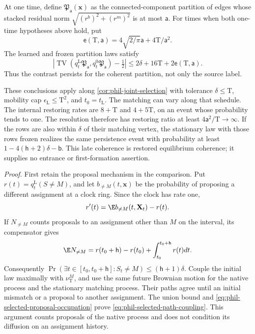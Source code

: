 At one time, define \(\mathfrak P_{\mathsf a}(\mathbf x)\) as the
connected-component partition of edges whose stacked residual norm
\(\sqrt{(r^b)^2+(r^m)^2}\) is at most \(\mathsf a\).
For times when both
one-time hypotheses above hold, put
\[
 \mathsf e(\mathrm T,\mathsf a)
 =4\sqrt{2/\pi}\mathsf a+4\mathrm T/\mathsf a^2.
\]
The learned and frozen partition laws satisfy
\begin{equation}
 \left|\operatorname{TV}
   (q_t^{\mathrm L}\mathfrak P_{\mathsf a},
                 q_t^0\mathfrak P_{\mathsf a})-\tfrac12\right|
 \le2\delta+16\mathrm T+2\mathsf e(\mathrm T,\mathsf a).
 \label{eq:phil-coherent-partition-contrast}
\end{equation}
Thus the contrast persists for the coherent partition, not only the
source label.

These conclusions apply along \cref{cor:phil-joint-selection} with
tolerance \(\delta\le\mathrm T\), mobility cap
\(\epsilon_{\mathrm L}\le\mathrm T^2\), and \(t_0=t_{\mathrm L}\).
The matching can vary along that schedule. The internal restoring rates
are \(8+\mathrm T\) and \(4+5\mathrm T\), on an event whose probability
tends to one. The resolution therefore has restoring ratio at least
\(4\mathsf a^2/\mathrm T\to\infty\).
If the rows are also within \(\delta\) of their matching vertex,
the stationary law with those rows frozen realizes the same persistence
event with probability at least
\(1-4(\mathsf h+2)\delta-\mathsf b\).
This late coherence is restored equilibrium coherence; it supplies no
entrance or first-formation assertion.

\noindent\emph{Proof.}
First retain the proposal mechanism in the comparison. Put
\(r(t)=q_t^{\mathrm L}(S\ne M)\), and let
\(b_{\ne M}(t,\mathbf x)\) be the probability of proposing a different
assignment at a clock ring. Since the clock has rate one,
\[
 r'(t)=\E b_{\ne M}(t,\mathbf X_t)-r(t).
\]
If \(N_{\ne M}\) counts proposals to an assignment other than \(M\)
on the interval, its compensator gives
\begin{equation}
 \E N_{\ne M}
 =r(t_0+\mathsf h)-r(t_0)+
                   \int_{t_0}^{t_0+\mathsf h}r(t)dt.
 \label{eq:phil-selected-proposal-occupation}
\end{equation}
Consequently
\(\Pr(\exists t\in[t_0,t_0+\mathsf h]:S_t\ne M)
 \le(\mathsf h+1)\delta\).
Couple the initial law maximally with \(\nu_{\mathrm T}^M\), and use
the same future Brownian motion for the native process and the
stationary matching process. Their paths agree until an initial
mismatch or a proposal to another assignment. The union bound and
\cref{eq:phil-selected-proposal-occupation} prove
\cref{eq:phil-selected-path-coupling}. This argument counts proposals
of the native process and does not condition its diffusion on an
assignment history.

